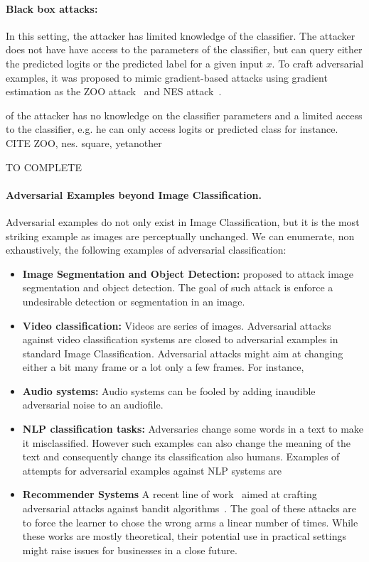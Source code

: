 \paragraph{Black box attacks:} In this setting, the attacker has limited knowledge of the classifier. The attacker does not have have access to the parameters of the classifier, but can query either the predicted logits or the predicted label for a given input $x$. To craft adversarial examples, it was proposed to mimic gradient-based attacks using gradient estimation as the ZOO attack~\citep{xxx} and NES attack~\citep{ilyas2018black,ilyas2019adversarial}. 



of the attacker has no knowledge on the classifier parameters and a limited access to the classifier, e.g. he can only access logits or predicted class for instance. CITE ZOO, nes. square, yetanother

TO COMPLETE







\paragraph{Adversarial Examples beyond Image Classification.} Adversarial examples do not only exist in Image Classification, but it is the most striking example as images are perceptually unchanged. We can enumerate, non exhaustively, the following examples of adversarial classification:
\begin{itemize}
    \item \textbf{Image Segmentation and Object Detection:} \cite{xie2017adversarial} proposed to attack image segmentation and object detection. The goal of such attack is enforce a undesirable detection or segmentation in an image. 
    \item \textbf{Video classification:} Videos are series of images. Adversarial attacks against video classification systems are closed to adversarial examples in standard Image Classification. Adversarial attacks might aim at changing either a bit many frame or a lot only a few frames. For instance,~\cite{}
    \item \textbf{Audio systems:} Audio systems can be fooled by adding inaudible adversarial noise to an audiofile. 
    \item \textbf{NLP classification tasks:} Adversaries change some words in a text to make it misclassified. However such examples can also change the meaning of the text and consequently change its classification also humans. Examples of attempts for adversarial examples against NLP systems are
    \item \textbf{Recommender Systems} A recent line of work~\cite{xxx,garcelon2020adversarial} aimed at crafting adversarial attacks against bandit algorithms~\citep{lattimore2018bandit}. The goal of these attacks are to force the learner to chose the wrong arms a linear number of times. While these works are mostly theoretical, their potential use in practical settings might raise issues for businesses in a close future.
\end{itemize}



